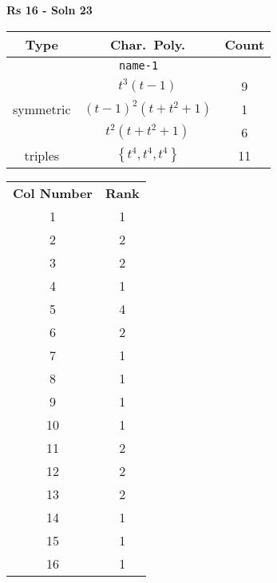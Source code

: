 \documentclass{article}
\begin{document}
    \textbf{Rs 16 - Soln 23}
    \begin{table}
    \begin{tabular}{|c|c|c|}
    \hline
    \textbf{Type} & \textbf{Char.~Poly.} & \textbf{Count} \\
    \hline \multicolumn{3}{|c|}{\texttt{name-1}} \\ \hline
    \multirow{3}{*}{symmetric}
    & $t^3(t - 1)$ & 9 \\
    & $(t - 1)^2(t + t^2 + 1)$ & 1 \\
    & $t^2(t + t^2 + 1)$ & 6 \\
    \hline
    \multirow{1}{*}{triples}
    & $\left\{t^4,t^4,t^4\right\}$ & 11 \\
    \hline
    \end{tabular}
    \end{table}
    \begin{table}
    \begin{tabular}{|c|c|}
    \hline
    \textbf{Col Number} & \textbf{Rank}\\
    1 & 1 \\ 
    2 & 2 \\ 
    3 & 2 \\ 
    4 & 1 \\ 
    5 & 4 \\ 
    6 & 2 \\ 
    7 & 1 \\ 
    8 & 1 \\ 
    9 & 1 \\ 
    10 & 1 \\ 
    11 & 2 \\ 
    12 & 2 \\ 
    13 & 2 \\ 
    14 & 1 \\ 
    15 & 1 \\ 
    16 & 1 \\ 
    \hline
    \end{tabular}
    \end{table}
    \newpage
\end{document}
